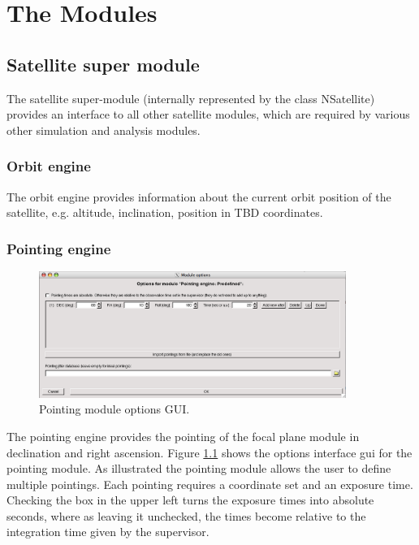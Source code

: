 \chapter{The Modules}

\section{Satellite super module}
The satellite super-module (internally represented by the class NSatellite) provides an interface to all other satellite modules, which are required by various other simulation and analysis modules.
\subsection{Orbit engine}
The orbit engine provides information about the current orbit position of the satellite, e.g. altitude, inclination, position in TBD coordinates.

\subsection{Pointing engine}
\begin{figure}[tb]
\begin{center}
\includegraphics[width=10cm]{images/pointingGUI.png}  
\caption{Pointing module options GUI.}
\label{pointinggui} 
\end{center}
\end{figure}
The pointing engine provides the pointing of the focal plane module in declination and right ascension. Figure \ref{pointinggui} shows the options interface gui for the pointing module. As illustrated the pointing module allows the user to define multiple pointings. Each pointing requires a coordinate set and an exposure time. Checking the box in the upper left turns the exposure times into absolute seconds, where as leaving it unchecked, the times become relative to the integration time given by the supervisor.

